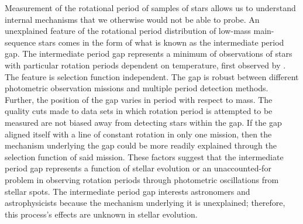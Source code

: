 Measurement of the rotational period of samples of stars allows us to understand internal mechanisms that we otherwise would not be able to probe.
An unexplained feature of the rotational period distribution of low-mass main-sequence stars comes in the form of what is known as the intermediate period gap.
The intermediate period gap represents a minimum of observations of stars with particular rotation periods dependent on temperature, first observed by \citet{mcquillan_rotation_2014}.
The feature is selection function independent.
The gap is robust between different photometric observation missions \citep{mcquillan_rotation_2014,davenport_rotating_2017,davenport_rotating_2018,lu_bridging_2022} and multiple period detection methods.
Further, the position of the gap varies in period with respect to mass. 
The quality cuts made to data sets in which rotation period is attempted to be measured \citep[e.g. removing binaries and subgiants]{mcquillan_rotation_2014, claytor_recovery_2022} are not biased away from detecting stars within the gap.
If the gap aligned itself with a line of constant rotation in only one mission, then the mechanism underlying the gap could be more readily explained through the selection function of said mission.
These factors suggest that the intermediate period gap represents a function of stellar evolution or an unaccounted-for problem in observing rotation periods through photometric oscillations from stellar spots.
The intermediate period gap interests astronomers and astrophysicists because the mechanism underlying it is unexplained; therefore, this process's effects are unknown in stellar evolution.

